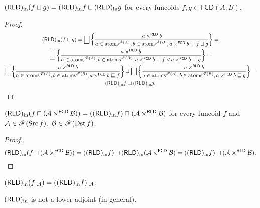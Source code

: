 \begin{thm}
$(\mathsf{RLD})_{\mathrm{in}}(f\sqcup g)=(\mathsf{RLD})_{\mathrm{in}} f\sqcup(\mathsf{RLD})_{\mathrm{in}} g$ for every funcoids
$f,g\in\mathsf{FCD}(A;B)$.\end{thm}
\begin{proof}
~
\begin{multline*}
\torldin(f\sqcup g)=\bigsqcup\setcond{a\times^{\mathsf{RLD}}b}{a\in\atoms^{\mathscr{F}(A)},b\in\atoms^{\mathscr{F}(B)},a\times^{\mathsf{FCD}}b\sqsubseteq f\sqcup g}=\\
\bigsqcup\setcond{a\times^{\mathsf{RLD}}b}{a\in\atoms^{\mathscr{F}(A)},b\in\atoms^{\mathscr{F}(B)},a\times^{\mathsf{FCD}}b\sqsubseteq f\vee a\times^{\mathsf{FCD}}b\sqsubseteq g}=\\
\bigsqcup\setcond{a\times^{\mathsf{RLD}}b}{a\in\atoms^{\mathscr{F}(A)},b\in\atoms^{\mathscr{F}(B)},a\times^{\mathsf{FCD}}b\sqsubseteq f}\sqcup\bigsqcup\setcond{a\times^{\mathsf{RLD}}b}{a\in\atoms^{\mathscr{F}(A)},b\in\atoms^{\mathscr{F}(B)},a\times^{\mathsf{FCD}}b\sqsubseteq g}=\\
\torldin f\sqcup\torldin g.
\end{multline*}
\end{proof}
\begin{prop}
$(\mathsf{RLD})_{\mathrm{in}}(f\sqcap(\mathcal{A}\times^{\mathsf{FCD}}\mathcal{B}))=((\mathsf{RLD})_{\mathrm{in}} f)\sqcap(\mathcal{A}\times^{\mathsf{RLD}}\mathcal{B})$
for every funcoid $f$ and $\mathcal{A}\in\mathscr{F}(\operatorname{Src} f)$, $\mathcal{B}\in\mathscr{F}(\operatorname{Dst} f)$.\end{prop}
\begin{proof}
~
\[
(\mathsf{RLD})_{\mathrm{in}}(f\sqcap(\mathcal{A}\times^{\mathsf{FCD}}\mathcal{B}))=((\mathsf{RLD})_{\mathrm{in}} f)\sqcap(\mathsf{RLD})_{\mathrm{in}}(\mathcal{A}\times^{\mathsf{FCD}}\mathcal{B})=((\mathsf{RLD})_{\mathrm{in}} f)\sqcap(\mathcal{A}\times^{\mathsf{RLD}}\mathcal{B}).
\]
\end{proof}
\begin{cor}
$(\mathsf{RLD})_{\mathrm{in}}(f|_{\mathcal{A}})=((\mathsf{RLD})_{\mathrm{in}} f)|_{\mathcal{A}}$.\end{cor}
\begin{conjecture}
$(\mathsf{RLD})_{\mathrm{in}}$ is not a lower adjoint (in general).
\end{conjecture}

